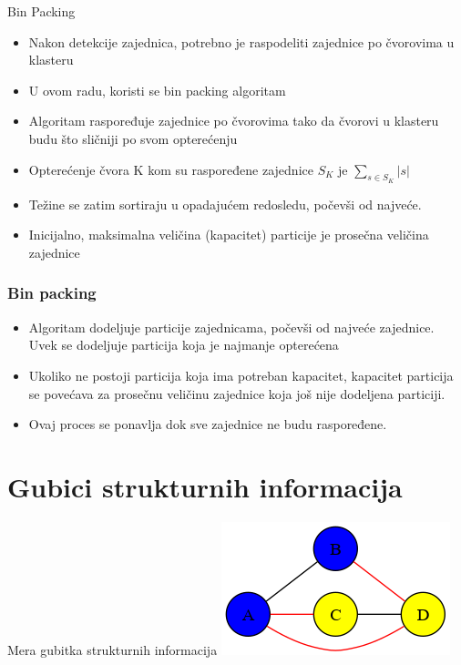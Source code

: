\documentclass{beamer}
\begin{document}
\begin{frame}{Bin Packing}
    \begin{itemize}
        \item Nakon detekcije zajednica, potrebno je raspodeliti zajednice po čvorovima u klasteru
        \item U ovom radu, koristi se bin packing algoritam
        \item Algoritam raspoređuje zajednice po čvorovima tako da čvorovi u klasteru budu što sličniji po svom opterećenju
        \item Opterećenje čvora K kom su raspoređene zajednice $ S_K $ je $ \sum_{s \in S_K} |s| $
        \item Težine se zatim sortiraju u opadajućem redosledu, počevši od najveće.
        \item Inicijalno, maksimalna veličina (kapacitet) particije je prosečna veličina zajednice 
    \end{itemize}
\end{frame}

\begin{frame}
    \frametitle{Bin packing}
    \begin{itemize}
        \item Algoritam dodeljuje particije zajednicama, počevši od najveće zajednice. Uvek se dodeljuje particija koja je najmanje opterećena
        \item Ukoliko ne postoji particija koja ima potreban kapacitet, kapacitet particija se povećava za prosečnu veličinu zajednice koja još nije dodeljena particiji. 
        \item Ovaj proces se ponavlja dok sve zajednice ne budu raspoređene.
    \end{itemize}
\end{frame}


\section{Gubici strukturnih informacija}
\begin{frame}{Mera gubitka strukturnih informacija}
    \includegraphics[width=\textwidth]{dot/graf.png}
\end{frame}
\end{document}
